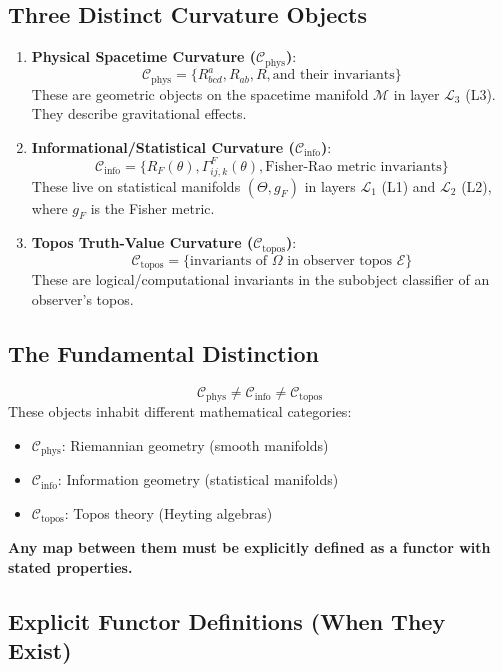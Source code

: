 \documentclass[11pt,titlepage]{article}
\newcommand{\Cphys}{\mathcal{C}_{\mathrm{phys}}}
\newcommand{\Cinfo}{\mathcal{C}_{\mathrm{info}}}
\newcommand{\Ctopos}{\mathcal{C}_{\mathrm{topos}}}
\newcommand{\protocol}{\mathcal{L}_1}
\newcommand{\logic}{\mathcal{L}_2}
\newcommand{\interface}{\mathcal{L}_3}
\begin{document}
\subsection{Three Distinct Curvature Objects}

\begin{enumerate}
    \item \textbf{Physical Spacetime Curvature ($\Cphys$)}:
    \[
    \Cphys = \{R^a_{bcd}, R_{ab}, R, \text{and their invariants}\}
    \]
    These are geometric objects on the spacetime manifold $\mathcal{M}$ in layer $\interface$ (L3). They describe gravitational effects.
    
    \item \textbf{Informational/Statistical Curvature ($\Cinfo$)}:
    \[
    \Cinfo = \{R_F(\theta), \Gamma^F_{ij,k}(\theta), \text{Fisher-Rao metric invariants}\}
    \]
    These live on statistical manifolds $(\Theta, g_F)$ in layers $\protocol$ (L1) and $\logic$ (L2), where $g_F$ is the Fisher metric.
    
    \item \textbf{Topos Truth-Value Curvature ($\Ctopos$)}:
    \[
    \Ctopos = \{\text{invariants of } \Omega \text{ in observer topos } \mathcal{E}\}
    \]
    These are logical/computational invariants in the subobject classifier of an observer's topos.
\end{enumerate}

\subsection{The Fundamental Distinction}

\begin{tcolorbox}[colback=red!5!white,colframe=red!75!black,title=Critical Notation Rule]
\[
\Cphys \neq \Cinfo \neq \Ctopos
\]
These objects inhabit different mathematical categories:
\begin{itemize}
    \item $\Cphys$: Riemannian geometry (smooth manifolds)
    \item $\Cinfo$: Information geometry (statistical manifolds) 
    \item $\Ctopos$: Topos theory (Heyting algebras)
\end{itemize}
\textbf{Any map between them must be explicitly defined as a functor with stated properties.}
\end{tcolorbox}

\subsection{Explicit Functor Definitions (When They Exist)}
\end{document}
